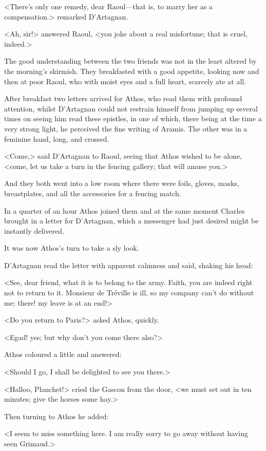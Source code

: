 <There's only one remedy, dear Raoul—that is, to marry her as a compensation.> remarked D'Artagnan.

<Ah, sir!> answered Raoul, <you joke about a real misfortune; that is cruel, indeed.>

The good understanding between the two friends was not in the least altered by the morning's skirmish. They breakfasted with a good appetite, looking now and then at poor Raoul, who with moist eyes and a full heart, scarcely ate at all.

After breakfast two letters arrived for Athos, who read them with profound attention, whilst D'Artagnan could not restrain himself from jumping up several times on seeing him read these epistles, in one of which, there being at the time a very strong light, he perceived the fine writing of Aramis. The other was in a feminine hand, long, and crossed.

<Come,> said D'Artagnan to Raoul, seeing that Athos wished to be alone, <come, let us take a turn in the fencing gallery; that will amuse you.>

And they both went into a low room where there were foils, gloves, masks, breastplates, and all the accessories for a fencing match.

In a quarter of an hour Athos joined them and at the same moment Charles brought in a letter for D'Artagnan, which a messenger had just desired might be instantly delivered.

It was now Athos's turn to take a sly look.

D'Artagnan read the letter with apparent calmness and said, shaking his head:

<See, dear friend, what it is to belong to the army. Faith, you are indeed right not to return to it. Monsieur de Tréville is ill, so my company can't do without me; there! my leave is at an end!>

<Do you return to Paris?> asked Athos, quickly.

<Egad! yes; but why don't you come there also?>

Athos coloured a little and answered:

<Should I go, I shall be delighted to see you there.>

<Halloo, Planchet!> cried the Gascon from the door, <we must set out in ten minutes; give the horses some hay.>

Then turning to Athos he added:

<I seem to miss something here. I am really sorry to go away without having seen Grimaud.>

